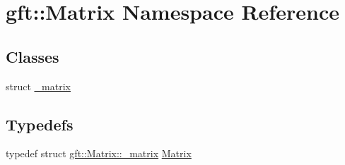 \hypertarget{namespacegft_1_1Matrix}{\section{gft\-:\-:Matrix Namespace Reference}
\label{namespacegft_1_1Matrix}
}
\subsection*{Classes}
\begin{DoxyCompactItemize}
\item 
struct \hyperlink{structgft_1_1Matrix_1_1__matrix}{\-\_\-matrix}
\end{DoxyCompactItemize}
\subsection*{Typedefs}
\begin{DoxyCompactItemize}
\item 
typedef struct \hyperlink{structgft_1_1Matrix_1_1__matrix}{gft\-::\-Matrix\-::\-\_\-matrix} \hyperlink{namespacegft_1_1Matrix_aac4dc9ea9c8dc9abade70a84fbea7939}{Matrix}
\end{DoxyCompactItemize}

